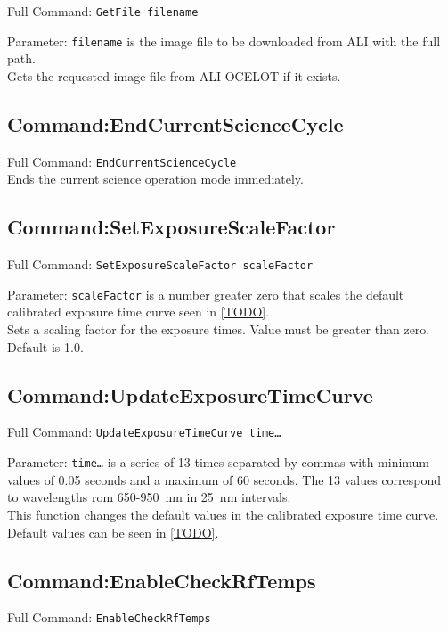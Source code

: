 Full Command: \texttt{GetFile filename}

Parameter: \texttt{filename} is the image file to be downloaded from ALI with the full path.\\

Gets the requested image file from ALI-OCELOT if it exists.

\subsection{Command:EndCurrentScienceCycle}

Full Command: \texttt{EndCurrentScienceCycle}\\

Ends the current science operation mode immediately.

\subsection{Command:SetExposureScaleFactor}

Full Command: \texttt{SetExposureScaleFactor scaleFactor}

Parameter: \texttt{scaleFactor} is a number greater zero that scales the default calibrated exposure time curve seen in \autoref{TODO}.\\

Sets a scaling factor for the exposure times. Value must be greater than zero. Default is 1.0.

\subsection{Command:UpdateExposureTimeCurve}

Full Command: \texttt{UpdateExposureTimeCurve time\ldots}

Parameter: \texttt{time\ldots} is a series of 13 times separated by commas with minimum values of 0.05 seconds and a maximum of 60 seconds. The 13 values correspond to wavelengths rom 650-950~nm in 25~nm intervals.\\

This function changes the default values in the calibrated exposure time curve. Default values can be seen in \autoref{TODO}.

\subsection{Command:EnableCheckRfTemps}

Full Command: \texttt{EnableCheckRfTemps}\\

